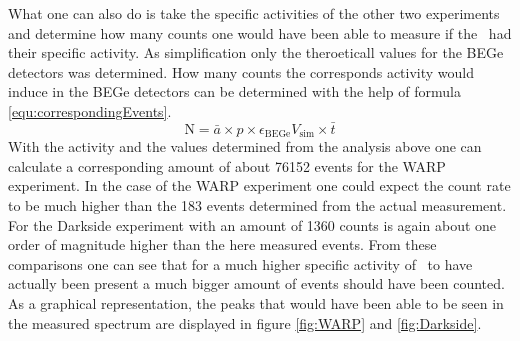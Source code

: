 \documentclass[encoding=utf8,british]{tumphthesis}
\begin{document}
What one can also do is take the specific activities of the other two experiments and determine how many counts one would have been able to measure if the \Kr\ had their specific activity.
As simplification only the theroeticall values for the BEGe detectors was determined. 
How many counts the corresponds activity would induce in the BEGe detectors can be determined with the help of formula \ref{equ:correspondingEvents}.
\begin{equation}
\mathrm{N} = \bar{a} \times p \times \epsilon_\mathrm{BEGe} V_{\mathrm{sim}} \times \bar{t}
\label{equ:correspondingEvents}
\end{equation}
With the activity and the values determined from the analysis above one can calculate a corresponding amount of about 76152 events for the WARP experiment.
In the case of the WARP experiment one could expect the count rate to be much higher than the 183 events determined from the actual measurement.
For the Darkside experiment with an amount of 1360 counts is again about one order of magnitude higher than the here measured events.
From these comparisons one can see that for a much higher specific activity of \Kr\ to have actually been present a much bigger amount of events should have been counted.
As a graphical representation, the peaks that would have been able to be seen in the measured spectrum are displayed in figure \ref{fig:WARP} and \ref{fig:Darkside}.
\\
\end{document}
